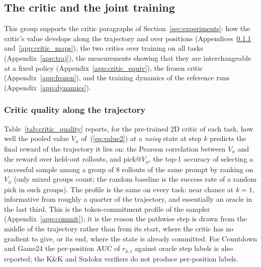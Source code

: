 \subsection{The critic and the joint training}
This group supports the critic paragraphs of Section~\ref{sec:experiments}: how the critic's value develops along the trajectory and over positions (Appendices~\ref{app:critic_quality} and~\ref{app:critic_maps}), the two critics over training on all tasks (Appendix~\ref{app:traj}), the measurements showing that they are interchangeable at a fixed policy (Appendix~\ref{app:critic_equiv}), the frozen critic (Appendix~\ref{app:frozen}), and the training dynamics of the reference runs (Appendix~\ref{app:dynamics}).

\subsubsection{Critic quality along the trajectory}
\label{app:critic_quality}
Table~\ref{tab:critic_quality} reports, for the pre-trained 2D critic of each task, how well the pooled value $V_\phi$ of~(\ref{eq:value2}) at a \emph{noisy} state at step $k$ predicts the final reward of the trajectory it lies on: the Pearson correlation between $V_\phi$ and the reward over held-out rollouts, and pick@$V_\phi$, the top-1 accuracy of selecting a successful sample among a group of 8 rollouts of the same prompt by ranking on $V_\phi$ (only mixed groups count; the random baseline is the success rate of a random pick in such groups). The profile is the same on every task: near chance at $k{=}1$, informative from roughly a quarter of the trajectory, and essentially an oracle in the last third. This is the token-commitment profile of the sampler (Appendix~\ref{app:commit}); it is the reason the pathwise step is drawn from the middle of the trajectory rather than from its start, where the critic has no gradient to give, or its end, where the state is already committed. For Countdown and Game24 the per-position AUC of $r_{k,i}$ against oracle step labels is also reported; the K\&K and Sudoku verifiers do not produce per-position labels.

